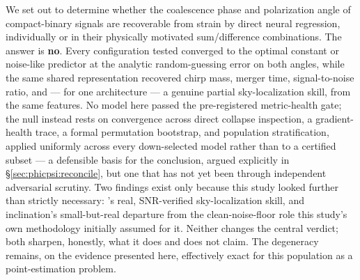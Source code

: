 We set out to determine whether the coalescence phase and polarization angle of compact-binary signals are recoverable from strain by direct neural regression, individually or in their physically motivated sum/difference combinations.
The answer is \textbf{no}.
Every configuration tested converged to the optimal constant or noise-like predictor at the analytic random-guessing error on both angles, while the same shared representation recovered chirp mass, merger time, signal-to-noise ratio, and --- for one architecture --- a genuine partial sky-localization skill, from the same features.
No model here passed the pre-registered metric-health gate; the null instead rests on convergence across direct collapse inspection, a gradient-health trace, a formal permutation bootstrap, and population stratification, applied uniformly across every down-selected model rather than to a certified subset --- a defensible basis for the conclusion, argued explicitly in \S\ref{sec:phicpsi:reconcile}, but one that has not yet been through independent adversarial scrutiny.
Two findings exist only because this study looked further than strictly necessary: \cnnAttn's real, SNR-verified sky-localization skill, and inclination's small-but-real departure from the clean-noise-floor role this study's own methodology initially assumed for it.
Neither changes the central verdict; both sharpen, honestly, what it does and does not claim.
The degeneracy remains, on the evidence presented here, effectively exact for this population as a point-estimation problem.
